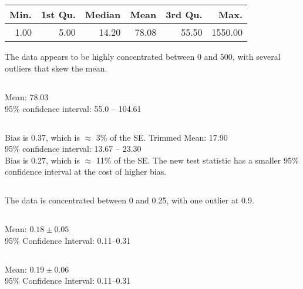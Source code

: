 \documentclass[twocolumn]{article}
\begin{document}


\clearpage



\newpage

\subsection{}
\begin{table}[h]
\begin{tabular}{@{}rrrrrr@{}}
\toprule
Min. & 1st Qu. & Median & Mean  & 3rd Qu. & Max.    \\ \midrule
1.00 & 5.00    & 14.20  & 78.08 & 55.50   & 1550.00 \\ \bottomrule
\end{tabular}
\end{table}
The data appears to be highly concentrated between 0 and 500, with several outliers that skew the mean.

\subsection{}
Mean: 78.03\\
95\% confidence interval: 55.0 -- 104.61
\subsection{}
Bias is 0.37, which is $\approx$ 3\% of the SE.
Trimmed Mean: 17.90\\
95\% confidence interval: 13.67 -- 23.30\\
Bias is 0.27, which is $\approx$ 11\% of the SE.
The new test statistic has a smaller 95\% confidence interval at the cost of higher bias.


\subsection{}
The data is concentrated between 0 and 0.25, with one outlier at 0.9.
\subsection{}
Mean: $0.18\pm 0.05$\\
95\% Confidence Interval: 0.11--0.31
\subsection{}
Mean: $0.19\pm 0.06$\\
95\% Confidence Interval: 0.11--0.31
\end{document}
